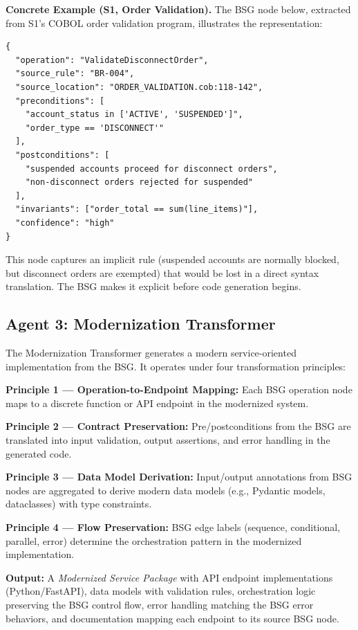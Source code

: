 \documentclass[conference]{IEEEtran}
\begin{document}
\textbf{Concrete Example (S1, Order Validation).} The BSG node below, extracted from S1's COBOL order validation program, illustrates the representation:

\begin{lstlisting}[caption={BSG Node --- S1 Disconnect Order Validation}, language={}]
{
  "operation": "ValidateDisconnectOrder",
  "source_rule": "BR-004",
  "source_location": "ORDER_VALIDATION.cob:118-142",
  "preconditions": [
    "account_status in ['ACTIVE', 'SUSPENDED']",
    "order_type == 'DISCONNECT'"
  ],
  "postconditions": [
    "suspended accounts proceed for disconnect orders",
    "non-disconnect orders rejected for suspended"
  ],
  "invariants": ["order_total == sum(line_items)"],
  "confidence": "high"
}
\end{lstlisting}

This node captures an implicit rule (suspended accounts are normally blocked, but disconnect orders are exempted) that would be lost in a direct syntax translation. The BSG makes it explicit before code generation begins.

\subsection{Agent 3: Modernization Transformer}

The Modernization Transformer generates a modern service-oriented implementation from the BSG. It operates under four transformation principles:

\textbf{Principle 1 --- Operation-to-Endpoint Mapping:} Each BSG operation node maps to a discrete function or API endpoint in the modernized system.

\textbf{Principle 2 --- Contract Preservation:} Pre/postconditions from the BSG are translated into input validation, output assertions, and error handling in the generated code.

\textbf{Principle 3 --- Data Model Derivation:} Input/output annotations from BSG nodes are aggregated to derive modern data models (e.g., Pydantic models, dataclasses) with type constraints.

\textbf{Principle 4 --- Flow Preservation:} BSG edge labels (sequence, conditional, parallel, error) determine the orchestration pattern in the modernized implementation.

\textbf{Output:} A \textit{Modernized Service Package} with API endpoint implementations (Python/FastAPI), data models with validation rules, orchestration logic preserving the BSG control flow, error handling matching the BSG error behaviors, and documentation mapping each endpoint to its source BSG node.
\end{document}
